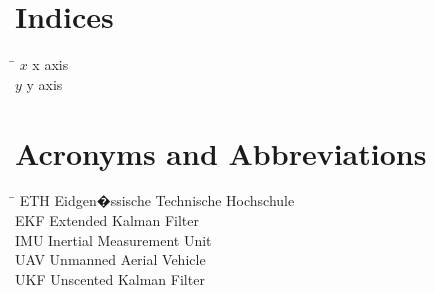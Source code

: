 \section*{Indices}
\begin{tabbing}
 \hspace*{1.6cm}  \= \kill
 $x$ \> x axis \\[0.5ex]
 $y$ \> y axis \\[0.5ex]
 
\end{tabbing}

\section*{Acronyms and Abbreviations}
\begin{tabbing}
 \hspace*{1.6cm}  \= \kill
 ETH \> Eidgen�ssische Technische Hochschule \\[0.5ex]
 EKF \> Extended Kalman Filter \\[0.5ex]
 IMU \> Inertial Measurement Unit \\[0.5ex]
 UAV \> Unmanned Aerial Vehicle \\[0.5ex]
 UKF \> Unscented Kalman Filter \\[0.5ex]
\end{tabbing}

 \cleardoublepage

